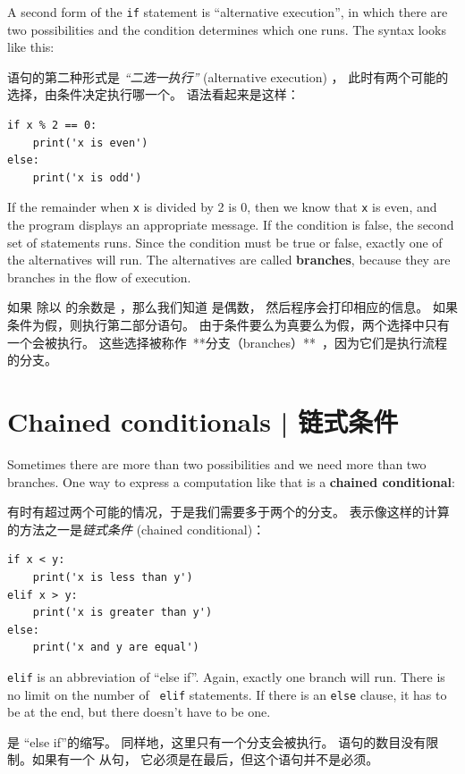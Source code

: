 {{{{A second form of the {\tt if} statement is ``alternative execution'',
in which there are two possibilities and the condition determines
which one runs.  The syntax looks like this:

 语句的第二种形式是 {\em ``二选一执行''} (alternative execution) ，
此时有两个可能的选择，由条件决定执行哪一个。 语法看起来是这样：


\begin{lstlisting}
if x % 2 == 0:
    print('x is even')
else:
    print('x is odd')
\end{lstlisting}
%
If the remainder when {\tt x} is divided by 2 is 0, then we know that
{\tt x} is even, and the program displays an appropriate message.  If
the condition is false, the second set of statements runs.
Since the condition must be true or false, exactly one of the
alternatives will run.  The alternatives are called {\bf
  branches}, because they are branches in the flow of execution.

如果  除以  的余数是 ，那么我们知道  是偶数，
然后程序会打印相应的信息。 如果条件为假，则执行第二部分语句。
由于条件要么为真要么为假，两个选择中只有一个会被执行。
这些选择被称作\ **分支（branches）**\ ，因为它们是执行流程的分支。

  


\section{Chained conditionals  |  链式条件}
  

Sometimes there are more than two possibilities and we need more than
two branches.  One way to express a computation like that is a {\bf
chained conditional}:

有时有超过两个可能的情况，于是我们需要多于两个的分支。
表示像这样的计算的方法之一是{\em 链式条件} (chained conditional)：

\begin{lstlisting}
if x < y:
    print('x is less than y')
elif x > y:
    print('x is greater than y')
else:
    print('x and y are equal')
\end{lstlisting}
%
{\tt elif} is an abbreviation of ``else if''.  Again, exactly one
branch will run.  There is no limit on the number of {\tt
elif} statements.  If there is an {\tt else} clause, it has to be
at the end, but there doesn't have to be one.

 是 ``else if''的缩写。 同样地，这里只有一个分支会被执行。
 语句的数目没有限制。如果有一个  从句，
它必须是在最后，但这个语句并不是必须。
  

}}}}
